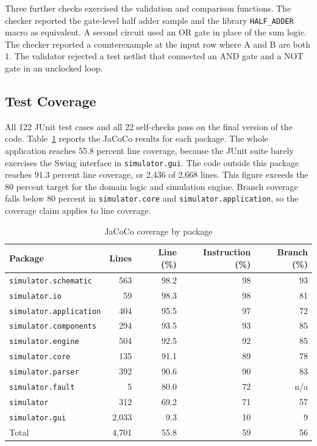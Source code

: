 Three further checks exercised the validation and comparison functions.
The checker reported the gate-level half adder sample and the library \texttt{HALF\_ADDER} macro as equivalent.
A second circuit used an OR gate in place of the sum logic.
The checker reported a counterexample at the input row where A and B are both 1.
The validator rejected a test netlist that connected an AND gate and a NOT gate in an unclocked loop.

\subsection{Test Coverage}
\label{sec:coverage}

All 122 JUnit test cases and all 22 self-checks pass on the final version of the code.
Table~\ref{tab:coverage} reports the JaCoCo results for each package.
The whole application reaches 55.8 percent line coverage, because the JUnit suite barely exercises the Swing interface in \texttt{simulator.gui}.
The code outside this package reaches 91.3 percent line coverage, or 2,436 of 2,668 lines.
This figure exceeds the 80 percent target for the domain logic and simulation engine.
Branch coverage falls below 80 percent in \texttt{simulator.core} and \texttt{simulator.application}, so the coverage claim applies to line coverage.

\begin{table}[H]
\centering
\small
\caption{JaCoCo coverage by package}
\label{tab:coverage}
\begin{tabular}{lrrrr}
\toprule
\textbf{Package} & \textbf{Lines} & \textbf{Line (\%)} & \textbf{Instruction (\%)} & \textbf{Branch (\%)} \\
\midrule
\texttt{simulator.schematic} & 563 & 98.2 & 98 & 93 \\
\texttt{simulator.io} & 59 & 98.3 & 98 & 81 \\
\texttt{simulator.application} & 404 & 95.5 & 97 & 72 \\
\texttt{simulator.components} & 294 & 93.5 & 93 & 85 \\
\texttt{simulator.engine} & 504 & 92.5 & 92 & 85 \\
\texttt{simulator.core} & 135 & 91.1 & 89 & 78 \\
\texttt{simulator.parser} & 392 & 90.6 & 90 & 83 \\
\texttt{simulator.fault} & 5 & 80.0 & 72 & n/a \\
\texttt{simulator} & 312 & 69.2 & 71 & 57 \\
\texttt{simulator.gui} & 2,033 & 9.3 & 10 & 9 \\
\midrule
Total & 4,701 & 55.8 & 59 & 56 \\
\bottomrule
\end{tabular}
\end{table}

